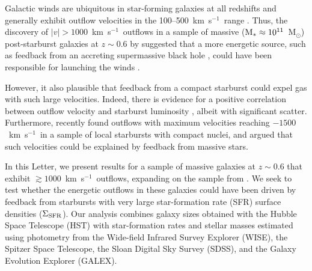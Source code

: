 \documentclass[apj]{emulateapj}
\newcommand{\kms}{km~s$^{-1}$}
\newcommand{\msun}{M$_{\odot}$}
\newcommand{\mstar}{M$_{*}$}
\newcommand{\sigmasfr}{\Sigma_{\textnormal{\scriptsize{SFR}}}}
\begin{document}
Galactic winds are ubiquitous in star-forming galaxies at all
redshifts and generally exhibit outflow velocities in the
100--500~\kms\ range
\citep[e.g.,][]{hec00,sha03,mar05,rup05,wei09,rub10,ste10}.  Thus, the
discovery of $|v|>1000$~\kms\ outflows in a sample of massive
($\textnormal{\mstar}\approx10^{11}$~\msun) post-starburst galaxies at
$z\sim0.6$ by \citet{tre07} suggested that a more energetic source,
such as feedback from an accreting supermassive black hole
\citep[e.g.,][]{sil98,dim05}, could have been responsible for
launching the winds \citep[see][for a recent review]{fab12}.

However, it also plausible that feedback from a compact starburst
could expel gas with such large velocities.  Indeed, there is evidence
for a positive correlation between outflow velocity and starburst
luminosity \citep[e.g.,][]{mar05,rup05,tre07}, albeit with significant
scatter.  Furthermore, \citet{hec11} recently found outflows with
maximum velocities reaching $-1500$~\kms\ in a sample of local
starbursts with compact nuclei, and argued that such velocities could
be explained by feedback from massive stars.


In this Letter, we present results for a sample of massive galaxies at
$z\sim0.6$ that exhibit $\gtrsim1000$~\kms\ outflows, expanding on the
sample from \citet{tre07}.  We seek to test whether the energetic
outflows in these galaxies could have been driven by feedback from
starbursts with very large star-formation rate (SFR) surface densities
($\sigmasfr$).  Our analysis combines galaxy sizes obtained with the
Hubble Space Telescope (HST) with star-formation rates and stellar
masses estimated using photometry from the Wide-field Infrared Survey
Explorer (WISE), the Spitzer Space Telescope, the Sloan Digital Sky
Survey (SDSS), and the Galaxy Evolution Explorer (GALEX).
\end{document}
